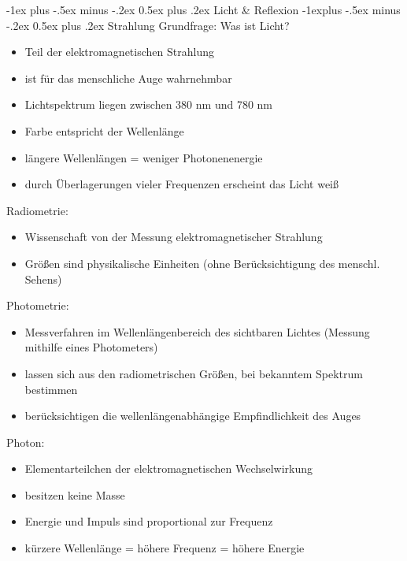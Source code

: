\documentclass[10pt,landscape]{article}
\makeatletter
\renewcommand{\section}{\@startsection{section}{1}{0mm}%
                                {-1ex plus -.5ex minus -.2ex}%
                                {0.5ex plus .2ex}%
                                {\normalfont\large\bfseries}}
\renewcommand{\subsection}{\@startsection{subsection}{2}{0mm}%
                                {-1explus -.5ex minus -.2ex}%
                                {0.5ex plus .2ex}%
                                {\normalfont\normalsize\bfseries}}
\makeatother
\begin{document}
\begin{multicols}{3}
  \section{Licht \& Reflexion}
  \subsection{ Strahlung}
  Grundfrage: Was ist Licht?
  \begin{itemize}
    \item Teil der elektromagnetischen Strahlung
    \item ist für das menschliche Auge wahrnehmbar
    \item Lichtspektrum liegen zwischen 380 nm und 780 nm
    \item Farbe entspricht der Wellenlänge
    \item längere Wellenlängen = weniger Photonenenergie
    \item durch Überlagerungen vieler Frequenzen erscheint das Licht weiß
  \end{itemize}
  
  Radiometrie:
  \begin{itemize}
    \item Wissenschaft von der Messung elektromagnetischer Strahlung
    \item Größen sind physikalische Einheiten (ohne Berücksichtigung des menschl. Sehens)
  \end{itemize}
  
  Photometrie:
  \begin{itemize}
    \item Messverfahren im Wellenlängenbereich des sichtbaren Lichtes (Messung mithilfe eines Photometers)
    \item lassen sich aus den radiometrischen Größen, bei bekanntem Spektrum bestimmen
    \item berücksichtigen die wellenlängenabhängige Empfindlichkeit des Auges
  \end{itemize}
  
  Photon:
  \begin{itemize}
    \item Elementarteilchen der elektromagnetischen Wechselwirkung
    \item besitzen keine Masse
    \item Energie und Impuls sind proportional zur Frequenz
    \item kürzere Wellenlänge = höhere Frequenz = höhere Energie
  \end{itemize}
  

\end{multicols}
\end{document}
